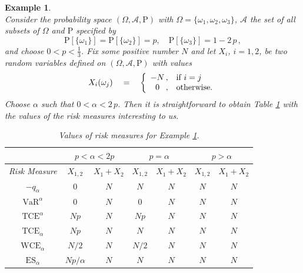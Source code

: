 \documentclass[11pt,a4paper,leqno]{article}
\newtheorem{example}[theorem]{Example}
\begin{document}
\begin{example}
  \label{ex:ineq} \ \rm\\
Consider the probability space $(\Omega, \mathcal{A}, \mathrm{P})$ with
$\Omega = \{ \omega_1,\omega_2,\omega_3  \}$, $\mathcal{A}$ the set of all subsets of $\Omega$
and
$\mathrm{P}$ specified by 
$$
\mathrm{P}[\{\omega_1\}]=\mathrm{P}[\{\omega_2\}]= p, \quad \mathrm{P}[\{\omega_3\}]= 1-2\,p\,, 
$$
and choose $0<p<\frac{1}{3}$. Fix some positive number $N$ and
let $X_i$, $i=1,2$, be two random variables defined on $(\Omega, \mathcal{A}, \mathrm{P})$ with values
$$
X_i(\omega_j)\quad =\quad\left\{
\begin{array}{c@{\,,\quad}l}
- N & \mbox{if}\ i = j\\
0 & \mbox{otherwise.}
\end{array}
\right.
$$
Choose $\alpha$ such that $0 < \alpha<2\,p$. Then it is straightforward to
obtain Table \ref{tab} with the values of the risk measures interesting to us.

\begin{table}[h]
\centering
\begin{tabular}{|c|cc|cc|cc|}\hline
\multicolumn{1}{|c|}{}  & \multicolumn{2}{c|}{\bf{$p<\alpha<2p$}}& \multicolumn{2}{c|}{\bf{$p=\alpha$}} &
\multicolumn{2}{c|}{\bf{$p > \alpha$}} \\ \hline 
 \multicolumn{1}{|c|}{Risk Measure}        & \multicolumn{1}{c}{$X_{1,2}$}& \multicolumn{1}{c|}{$X_1+X_2$}
        & \multicolumn{1}{c}{$X_{1,2}$}& \multicolumn{1}{c|}{$X_1+X_2$} & \multicolumn{1}{c}{$X_{1,2}$}& \multicolumn{1}{c|}{$X_1+X_2$} \\ \hline 
$- q_{\alpha}$ & $0$  & $N$& $N$      & $N$ & $N$ & $N$           \\
$\mathrm{VaR}^{\alpha}$ & $0$  & $N$& $0$      & $N$ & $N$ & $N$           \\
$\mathrm{TCE}^{\alpha}$ & $N p$        & $N$& $N p$      & $N$  & $N$ & $N$                  \\
$\mathrm{TCE}_{\alpha}$ & $N p$        & $N$& $N$      & $N$   & $N$ & $N$                 \\
$\mathrm{WCE}_{\alpha}$ &  $N/2$       & $N$   & $N/2$   & $N$  & $N$ & $N$          \\
$\mathrm{ES}_{\alpha}$ &  $N p/\alpha$ & $N$   & $N$   & $N$   & $N$ & $N$         \\
 \hline 
\end{tabular}
\caption{Values of risk measures for Example \ref{ex:ineq}.}
\label{tab}
\end{table}


\end{example}
\end{document}
